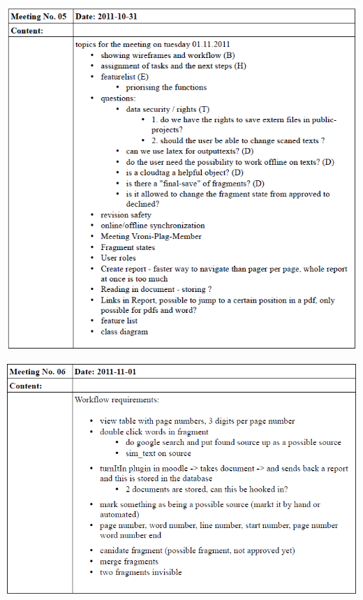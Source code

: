 \begin{appendix}
    \includegraphics[width=\textwidth]{images/a_meetings/meeting_05.png}



    \includegraphics[width=\textwidth]{images/a_meetings/meeting_06.png}



\end{appendix}
